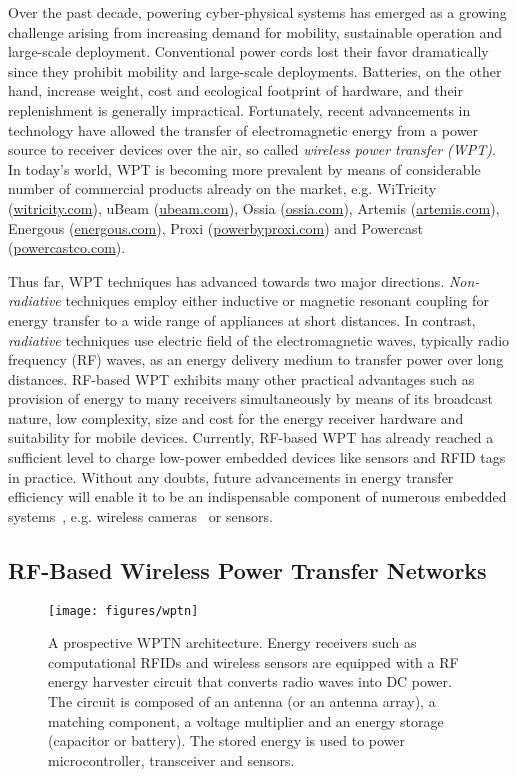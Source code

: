 \documentclass[journal,10pt,draftclsnofoot,onecolumn]{IEEEtran}
\begin{document}
Over the past decade, powering cyber-physical systems has emerged as a growing challenge arising from increasing demand for mobility, sustainable operation and large-scale deployment. Conventional power cords lost their favor dramatically since they prohibit mobility and large-scale deployments. Batteries, on the other hand, increase weight, cost and ecological footprint of hardware, and their replenishment is generally impractical. Fortunately, recent advancements in technology have allowed the transfer of electromagnetic energy from a power source to receiver devices over the air, so called \emph{wireless power transfer} \emph{(WPT)}. In today's world, WPT is becoming more prevalent by means of considerable number of commercial products already on the market, e.g. WiTricity (\href{http://witricity.com/}{witricity.com}), uBeam (\href{http://ubeam.com/}{ubeam.com}), Ossia (\href{http://www.ossia.com/}{ossia.com}), Artemis (\href{http://www.artemis.com/}{artemis.com}), Energous (\href{http://www.energous.com/}{energous.com}), Proxi (\href{http://powerbyproxi.com/}{powerbyproxi.com}) and Powercast (\href{http://www.powercastco.com/}{powercastco.com}).

Thus far, WPT techniques has advanced towards two major directions. \emph{Non-radiative} techniques employ either inductive or magnetic resonant coupling for energy transfer to a wide range of appliances at short distances. In contrast, \emph{radiative} techniques use electric field of the electromagnetic waves, typically radio frequency (RF) waves, as an energy delivery medium to transfer power over long distances. RF-based WPT exhibits many other practical advantages such as provision of energy to many receivers simultaneously by means of its broadcast nature, low complexity, size and cost for the energy receiver hardware and suitability for mobile devices. Currently, RF-based WPT has already reached a sufficient level to charge low-power embedded devices like sensors and RFID tags in practice. Without any doubts, future advancements in energy transfer efficiency will enable it to be an indispensable component of numerous embedded systems~\cite{rf_powered_computing_gollakota_2014}, e.g. wireless cameras~\cite{wispcam_2015} or sensors.

\subsection{RF-Based Wireless Power Transfer Networks}

\begin{figure*}
\centering
\texttt{[image: figures/wptn]}
\caption{\label{fig:wptn}A prospective WPTN architecture. Energy receivers such as computational RFIDs and wireless sensors are equipped with a RF energy harvester circuit that converts radio waves into DC power. The circuit is composed of an antenna (or an antenna array), a matching component, a voltage multiplier and an energy storage (capacitor or battery). The stored energy is used to power microcontroller, transceiver and sensors.}
\end{figure*}
\end{document}
